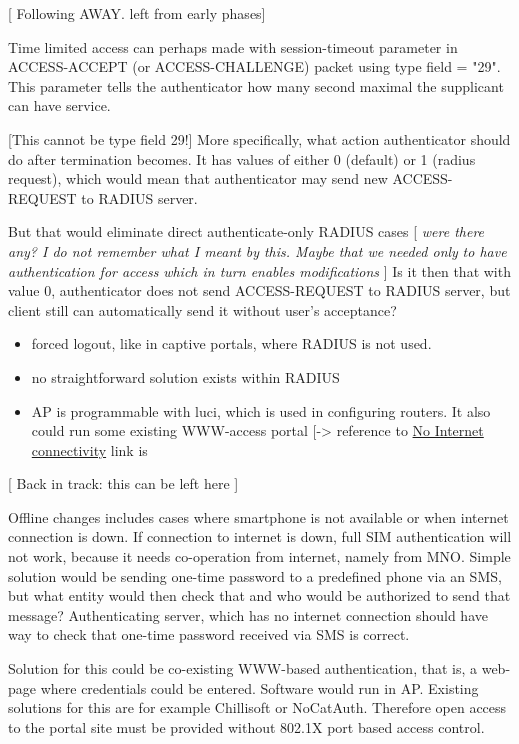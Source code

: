 \documentclass[12pt,a4paper,english]{tutthesis}
\begin{document}
[ Following AWAY. left from early phases]

Time limited access can perhaps made with session-timeout parameter
in ACCESS-ACCEPT (or ACCESS-CHALLENGE) packet using type field = "29".
This parameter tells the authenticator how many second maximal the supplicant
can have service. 

[This cannot be type field 29!]  More specifically, what action
authenticator should do after termination becomes. It has values of
either 0 (default) or 1 (radius request), which would mean that
authenticator may send new ACCESS-REQUEST to RADIUS server.

But that would eliminate direct authenticate-only RADIUS cases
  [ \emph{were there}
 \emph{any? I do not remember what I meant}
 \emph{by this. Maybe that we needed only}
 \emph{to have authentication for access} 
 \emph{which in turn enables modifications} ]
Is it then that with value 0, authenticator does not send
ACCESS-REQUEST to RADIUS server, but client still can automatically send it without 
user's acceptance?
\begin{itemize}
\item forced logout, like in captive portals, where RADIUS is not used.
\item no straightforward solution exists within RADIUS
\item AP is programmable with luci, which is used in configuring routers. It also could run some existing WWW-access
portal [-> reference to \hyperref[text:nointernet]{No Internet connectivity} link is
\end{itemize}








[ Back in track: this can be left here ]

Offline changes includes cases where smartphone is not available
 or when internet connection is down.
If connection to internet is down, full SIM authentication will not
work, because it needs co-operation from internet, namely from MNO.
Simple solution would be sending one-time password to a predefined
phone via an SMS, but what entity would then check that and who would
be authorized to send that message?
Authenticating server, which has no internet connection should 
have way to check that one-time password received via SMS is correct.

Solution for this could be co-existing WWW-based authentication, that
is, a web-page where credentials could be entered.
Software would run in AP. Existing solutions for this are for example
Chillisoft or NoCatAuth. 
Therefore open access to the portal site must be provided without
802.1X port based access control.
\end{document}
